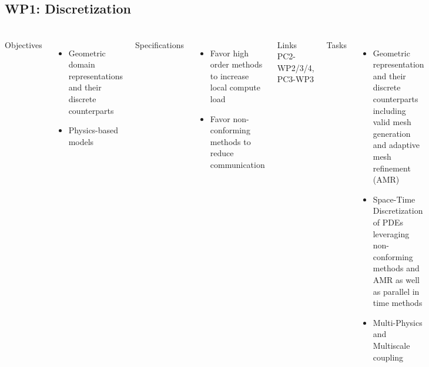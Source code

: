 \subsection{WP1: Discretization}
\begin{frame}
  \frametitle{\insertsectionhead}
  \framesubtitle{\insertsubsectionhead}

  \begin{columns}[t]
    Objectives
    \begin{itemize}
      \item Geometric domain representations and their discrete counterparts 
      \item Physics-based models 
    \end{itemize}
    Specifications
    \begin{itemize}
      \item Favor high order methods to increase local compute load
      \item Favor non-conforming methods to reduce communication
    \end{itemize}
    \begin{alertblock}{Links}
      PC2-WP2/3/4, PC3-WP3 
    \end{alertblock}
    Tasks
    \begin{itemize}
      \item Geometric representation and their discrete counterparts  including valid mesh generation and adaptive mesh refinement (AMR) 
      \item Space-Time Discretization of PDEs leveraging non-conforming methods and AMR as well as parallel in time methods
      \item Multi-Physics and Multiscale coupling
    \end{itemize}


  \end{columns}
\end{frame}



